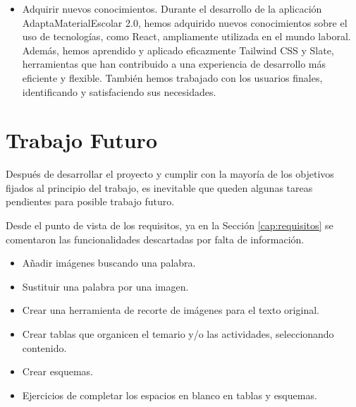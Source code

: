 \begin{itemize}
\begin{itemize}
    \end{itemize}
    \item Adquirir nuevos conocimientos. Durante el desarrollo de la aplicación AdaptaMaterialEscolar 2.0, hemos adquirido nuevos conocimientos sobre el uso de tecnologías, como React, ampliamente utilizada en el mundo laboral. Además, hemos aprendido y aplicado eficazmente Tailwind CSS y Slate, herramientas que han contribuido a una experiencia de desarrollo más eficiente y flexible. También hemos trabajado con los usuarios finales, identificando y satisfaciendo sus necesidades.
 \end{itemize}




\section{Trabajo Futuro}
\label{sec:TrabajoFuturo}
Después de desarrollar el proyecto y cumplir con la mayoría de los objetivos fijados al principio del trabajo, es inevitable que queden algunas tareas pendientes para posible trabajo futuro.

Desde el punto de vista de los requisitos, ya en la Sección \ref{cap:requisitos} se comentaron las funcionalidades descartadas por falta de información.

\begin{itemize}
    \item Añadir imágenes buscando una palabra.
    \item Sustituir una palabra por una imagen.
    \item Crear una herramienta de recorte de imágenes para el texto original.
    \item Crear tablas que organicen el temario y/o las actividades, seleccionando contenido.
    \item Crear esquemas.
    \item Ejercicios de completar los espacios en blanco en tablas y esquemas.
\end{itemize}

